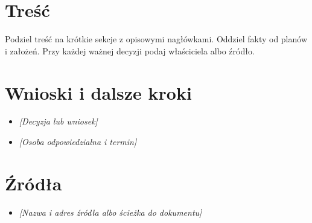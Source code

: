\documentclass[11pt,a4paper]{article}
\begin{document}
\section{Treść}
Podziel treść na krótkie sekcje z opisowymi nagłówkami. Oddziel fakty od planów i założeń. Przy każdej ważnej decyzji podaj właściciela albo źródło.

\section{Wnioski i dalsze kroki}
\begin{itemize}
  \item \emph{[Decyzja lub wniosek]}
  \item \emph{[Osoba odpowiedzialna i termin]}
\end{itemize}

\section{Źródła}
\begin{itemize}
  \item \emph{[Nazwa i adres źródła albo ścieżka do dokumentu]}
\end{itemize}
\end{document}
